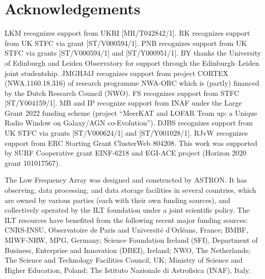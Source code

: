 \documentclass[usenatbib,fleqn,letters]{mnras}
\begin{document}
\section*{Acknowledgements}
LKM recognizes support from UKRI [MR/T042842/1]. 
RK recognizes support from UK STFC via grant [ST/V000594/1].
PNB recognizes support from UK STFC via grants [ST/V000594/1] and [ST/Y000951/1].
BY thanks the University of Edinburgh and Leiden Observatory for support through the Edinburgh–Leiden joint studentship.
JMGHJdJ recognizes support from project CORTEX (NWA.1160.18.316) of research programme NWA-ORC which is (partly) financed by the Dutch Research Council (NWO). 
FS recognizes support from STFC [ST/Y004159/1]. 
MB and IP recognize support from INAF under the Large Grant 2022 funding scheme (project “MeerKAT and LOFAR Team up: a Unique Radio Window on Galaxy/AGN co-Evolution”).
DJBS recognizes support from UK STFC via grants [ST/V000624/1] and  [ST/Y001028/1].
RJvW recognizes support from ERC Starting Grant ClusterWeb 804208. 
This work was supported by SURF Cooperative grant EINF-6218 and EGI-ACE project (Horizon 2020 grant 101017567).
 
The Low Frequency Array was designed and constructed by ASTRON. It has observing, data processing, and data storage facilities in several countries, which are owned by various parties (each with their own funding sources), and collectively operated by the ILT foundation under a joint scientific policy. The ILT resources have benefited from the following recent major funding sources: CNRS-INSU, Observatoire de Paris and Université d'Orléans, France; BMBF, MIWF-NRW, MPG, Germany; Science Foundation Ireland (SFI), Department of Business, Enterprise and Innovation (DBEI), Ireland; NWO, The Netherlands; The Science and Technology Facilities Council, UK; Ministry of Science and Higher Education, Poland; The Istituto Nazionale di Astrofisica (INAF), Italy. 









\label{lastpage}
\end{document}
